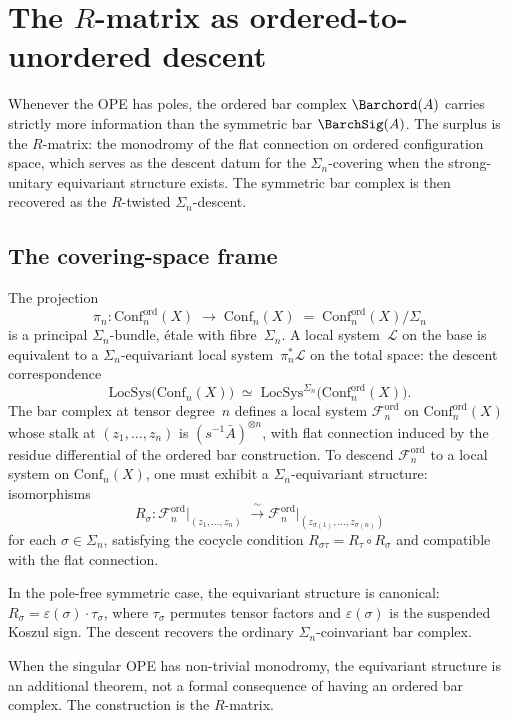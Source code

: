 \section{The $R$-matrix as ordered-to-unordered descent}
\label{sec:r-matrix-descent}

Whenever the OPE has poles, the ordered bar complex $\Barchord(A)$
carries strictly more information than the symmetric bar $\BarchSig(A)$.
The surplus is the $R$-matrix: the monodromy of the flat connection
on ordered configuration space, which serves as the descent datum
for the $\Sigma_n$-covering when the strong-unitary equivariant
structure exists. The symmetric bar complex is then recovered as the
$R$-twisted $\Sigma_n$-descent.

\subsection*{The covering-space frame}

\begin{construction}
\ClaimStatusProvedHere
\label{constr:r-matrix-covering-vol1}
The projection
\[
\pi_n\colon
\mathrm{Conf}_n^{\mathrm{ord}}(X)
\;\longrightarrow\;
\mathrm{Conf}_n(X)
\;=\;
\mathrm{Conf}_n^{\mathrm{ord}}(X)/\Sigma_n
\]
is a principal $\Sigma_n$-bundle, \'etale with fibre~$\Sigma_n$.
A local system~$\mathcal{L}$ on the base is equivalent to a
$\Sigma_n$-equivariant local system~$\pi_n^*\mathcal{L}$
on the total space: the descent correspondence
\[
\mathrm{LocSys}\bigl(\mathrm{Conf}_n(X)\bigr)
\;\simeq\;
\mathrm{LocSys}^{\Sigma_n}
\bigl(\mathrm{Conf}_n^{\mathrm{ord}}(X)\bigr).
\]
The bar complex at tensor degree~$n$ defines a local system
$\mathcal{F}_n^{\mathrm{ord}}$ on $\mathrm{Conf}_n^{\mathrm{ord}}(X)$
whose stalk at $(z_1,\dots,z_n)$ is
$(s^{-1}\bar A)^{\otimes n}$, with flat connection induced by the
residue differential of the ordered bar construction. To descend
$\mathcal{F}_n^{\mathrm{ord}}$ to a local system on $\mathrm{Conf}_n(X)$,
one must exhibit a $\Sigma_n$-equivariant structure: isomorphisms
\[
R_\sigma\colon
\mathcal{F}_n^{\mathrm{ord}}\big|_{(z_1,\dots,z_n)}
\;\xrightarrow{\;\sim\;}
\mathcal{F}_n^{\mathrm{ord}}\big|_{(z_{\sigma(1)},\dots,z_{\sigma(n)})}
\]
for each $\sigma\in\Sigma_n$, satisfying the cocycle condition
$R_{\sigma\tau}=R_\tau\circ R_\sigma$ and compatible with the
flat connection.

In the pole-free symmetric case, the equivariant structure is
canonical: $R_\sigma=\varepsilon(\sigma)\cdot\tau_\sigma$, where
$\tau_\sigma$ permutes tensor factors and $\varepsilon(\sigma)$ is
the suspended Koszul sign. The descent recovers the ordinary
$\Sigma_n$-coinvariant bar complex.

When the singular OPE has non-trivial monodromy, the equivariant
structure is an additional theorem, not a formal consequence of
having an ordered bar complex. The construction is the $R$-matrix.
\end{construction}

